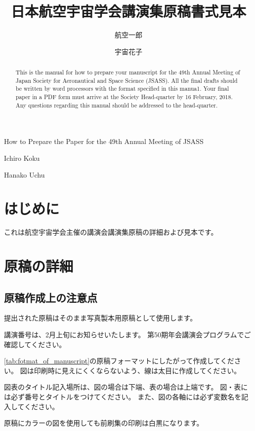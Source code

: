 \documentclass{jsass-nenkai}
\begin{document}
\title{日本航空宇宙学会講演集原稿書式見本}{How to Prepare the Paper for the 49th Annual Meeting of JSASS}

\author{航空一郎}{Ichiro Koku}
\author{宇宙花子}{Hanako Uchu}



\begin{abstract}
  This is the manual for how to prepare your manuscript for the 49th Annual Meeting of Japan Society for Aeronautical and Space Science (JSASS).
  All the final drafts should be written by word processors with the format specified in this manua1.
  Your final paper in a PDF form must arrive at the Society Head-quarter by 16 February, 2018.
  Any questions regarding this manual should be addressed to the head-quarter.
\end{abstract}

\maketitle


\section{はじめに}
  これは航空宇宙学会主催の講演会講演集原稿の詳細および見本です。

\section{原稿の詳細}
  \subsection{原稿作成上の注意点}
    提出された原稿はそのまま写真製本用原稿として使用します。

    講演番号は、2月上旬にお知らせいたします。
    第50期年会講演会プログラムでご確認してください。

    \cref{tab:fotmat_of_manuscript}の原稿フォーマットにしたがって作成してください。
    図は印刷時に見えにくくならないよう、線は太目に作成してください。

    図表のタイトル記入場所は、図の場合は下端、表の場合は上端です。
    図・表には必ず番号とタイトルをつけてください。
    また、図の各軸には必ず変数名を記入してください。

    原稿にカラーの図を使用しても前刷集の印刷は白黒になります。
\end{document}
